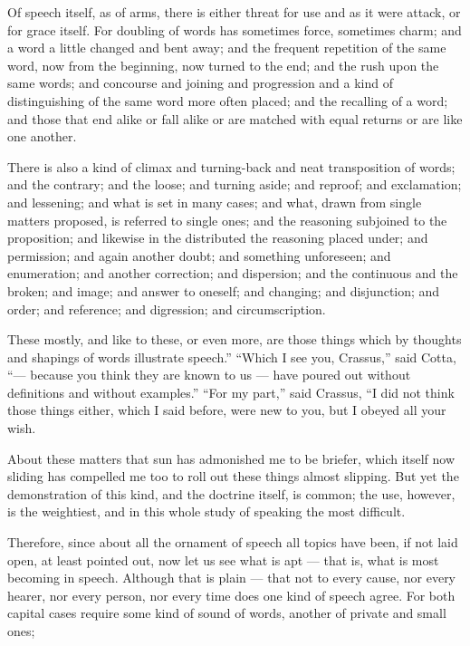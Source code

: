  Of speech itself, as of arms, there is either threat for use and as it were attack, or for grace itself. For doubling of words has sometimes force, sometimes charm; and a word a little changed and bent away; and the frequent repetition of the same word, now from the beginning, now turned to the end; and the rush upon the same words; and concourse and joining and progression and a kind of distinguishing of the same word more often placed; and the recalling of a word; and those that end alike or fall alike or are matched with equal returns or are like one another.

 There is also a kind of climax and turning-back and neat transposition of words; and the contrary; and the loose; and turning aside; and reproof; and exclamation; and lessening; and what is set in many cases; and what, drawn from single matters proposed, is referred to single ones; and the reasoning subjoined to the proposition; and likewise in the distributed the reasoning placed under; and permission; and again another doubt; and something unforeseen; and enumeration; and another correction; and dispersion; and the continuous and the broken; and image; and answer to oneself; and changing; and disjunction; and order; and reference; and digression; and circumscription.

 These mostly, and like to these, or even more, are those things which by thoughts and shapings of words illustrate speech.'' ``Which I see you, Crassus,'' said Cotta, ``— because you think they are known to us — have poured out without definitions and without examples.'' ``For my part,'' said Crassus, ``I did not think those things either, which I said before, were new to you, but I obeyed all your wish.

 About these matters that sun has admonished me to be briefer, which itself now sliding has compelled me too to roll out these things almost slipping. But yet the demonstration of this kind, and the doctrine itself, is common; the use, however, is the weightiest, and in this whole study of speaking the most difficult.

 Therefore, since about all the ornament of speech all topics have been, if not laid open, at least pointed out, now let us see what is apt — that is, what is most becoming in speech. Although that is plain — that not to every cause, nor every hearer, nor every person, nor every time does one kind of speech agree. For both capital cases require some kind of sound of words, another of private and small ones;

